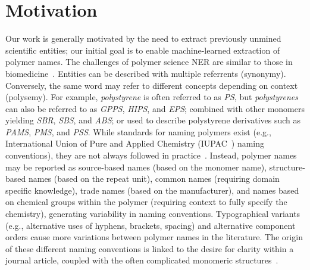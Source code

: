 \section{Motivation}
\label{sect:background}
Our work is generally motivated by the need to extract previously unmined scientific entities;
our initial goal is to enable machine-learned extraction of polymer names. 
The challenges of polymer science NER are similar to those in biomedicine~\cite{krallinger2015chemdner,kim2004introduction}. 
Entities can be described with multiple referrents (synonymy).
Conversely, the same word may refer to different concepts depending on context (polysemy).
For example,
\textit{polystyrene} is often referred to as \textit{PS}, but \textit{polystyrenes} can also be referred to as \textit{GPPS}, \textit{HIPS}, and \textit{EPS}; combined with other monomers yielding \textit{SBR}, \textit{SBS}, and \textit{ABS}; or used to describe polystyrene derivatives such as \textit{PAMS}, \textit{PMS}, and \textit{PSS}.
While standards for naming polymers exist (e.g., International Union of Pure and Applied Chemistry (IUPAC~\cite{hiorns2013brief}) naming conventions), they are not always followed in practice~\cite{tamames2006success}. 
Instead, polymer names may be reported as source-based names (based on the monomer name), structure-based names (based on the repeat unit), common names (requiring domain specific knowledge), trade names (based on the manufacturer), and names based on chemical groups within the polymer (requiring context to fully specify the chemistry), generating variability in naming conventions.
Typographical variants (e.g., alternative uses of hyphens, brackets, spacing) and alternative component orders cause more variations between polymer names in the literature.
The origin of these different naming conventions is linked to the desire for clarity within a journal article, coupled with the often complicated monomeric structures~\cite{audus2017polymer}.
